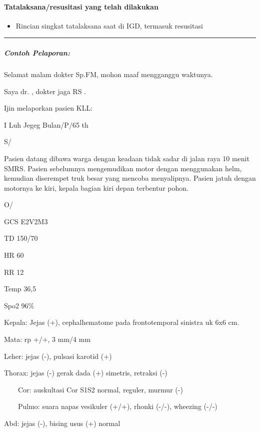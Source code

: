 \documentclass[
]{book}
\providecommand{\tightlist}{%
  \setlength{\itemsep}{0pt}\setlength{\parskip}{0pt}}
\begin{document}
\hypertarget{tatalaksanaresusitasi-yang-telah-dilakukan-1}{%
\paragraph{Tatalaksana/resusitasi yang telah dilakukan}\label{tatalaksanaresusitasi-yang-telah-dilakukan-1}}

\begin{itemize}
\tightlist
\item
  Rincian singkat tatalaksana saat di IGD, termasuk resusitasi
\end{itemize}

\begin{center}\rule{0.5\linewidth}{0.5pt}\end{center}

\hypertarget{contoh-pelaporan-1}{%
\subparagraph{Contoh Pelaporan:}\label{contoh-pelaporan-1}}

Selamat malam dokter Sp.FM, mohon maaf mengganggu waktunya.

Saya dr. , dokter jaga RS .

Ijin melaporkan pasien KLL:

I Luh Jegeg Bulan/P/65 th

S/

Pasien datang dibawa warga dengan keadaan tidak sadar di jalan raya 10 menit SMRS. Pasien sebelumnya mengemudikan motor dengan menggunakan helm, kemudian diserempet truk besar yang mencoba menyalipnya. Pasien jatuh dengan motornya ke kiri, kepala bagian kiri depan terbentur pohon.

O/

GCS E2V2M3

TD 150/70

HR 60

RR 12

Temp 36,5

Spo2 96\%

Kepala: Jejas (+), cephalhematome pada frontotemporal sinistra uk 6x6 cm.

Mata: rp +/+, 3 mm/4 mm

Leher: jejas (-), pulsasi karotid (+)

Thorax: jejas (-) gerak dada (+) simetris, retraksi (-)

~~~~Cor: auskultasi Cor S1S2 normal, reguler, murmur (-)

~~~~Pulmo: suara napas vesikuler (+/+), rhonki (-/-), wheezing (-/-)

Abd: jejas (-), bising usus (+) normal
\end{document}
